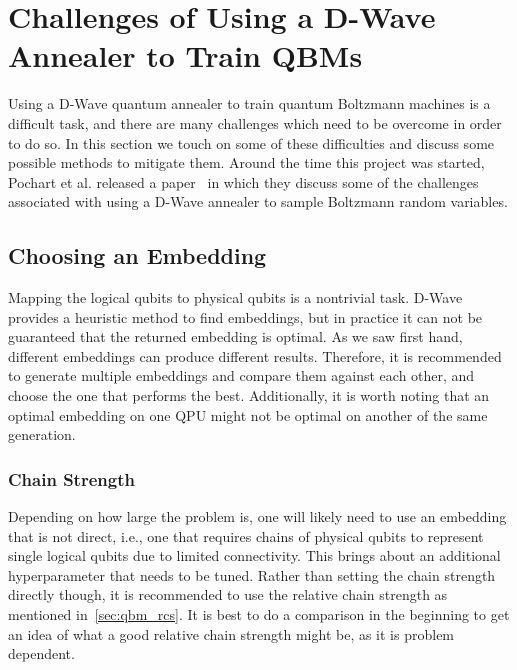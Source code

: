 \clearpage
\section{Challenges of Using a D-Wave Annealer to Train QBMs}\label{sec:challenges}
Using a D-Wave quantum annealer to train quantum Boltzmann machines is a difficult task, and there are many challenges which need to be overcome in order to do so.
In this section we touch on some of these difficulties and discuss some possible methods to mitigate them.
Around the time this project was started, Pochart et al. released a paper~\cite{pochart_2021} in which they discuss some of the challenges associated with using a D-Wave annealer to sample Boltzmann random variables.

\subsection{Choosing an Embedding}
Mapping the logical qubits to physical qubits is a nontrivial task.
D-Wave provides a heuristic method to find embeddings, but in practice it can not be guaranteed that the returned embedding is optimal.
As we saw first hand, different embeddings can produce different results.
Therefore, it is recommended to generate multiple embeddings and compare them against each other, and choose the one that performs the best.
Additionally, it is worth noting that an optimal embedding on one QPU might not be optimal on another of the same generation.

\subsubsection{Chain Strength}
Depending on how large the problem is, one will likely need to use an embedding that is not direct, i.e., one that requires chains of physical qubits to represent single logical qubits due to limited connectivity.
This brings about an additional hyperparameter that needs to be tuned.
Rather than setting the chain strength directly though, it is recommended to use the relative chain strength as mentioned in~\cref{sec:qbm_rcs}.
It is best to do a comparison in the beginning to get an idea of what a good relative chain strength might be, as it is problem dependent.

